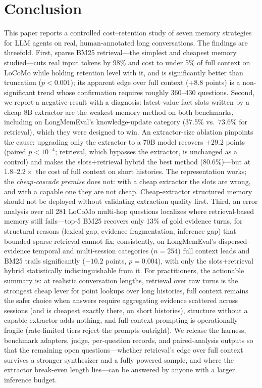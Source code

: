 \documentclass[conference]{IEEEtran}
\begin{document}
\section{Conclusion}

This paper reports a controlled cost--retention study of seven memory strategies for LLM agents on real, human-annotated long conversations. The findings are threefold. First, sparse BM25 retrieval---the simplest and cheapest memory studied---cuts real input tokens by 98\% and cost to under 5\% of full context on LoCoMo while holding retention level with it, and is significantly better than truncation ($p<0.001$); its apparent edge over full context ($+8.8$ points) is a non-significant trend whose confirmation requires roughly 360--430 questions. Second, we report a negative result with a diagnosis: latest-value fact slots written by a cheap 8B extractor are the weakest memory method on both benchmarks, including on LongMemEval's knowledge-update category (37.5\% vs.\ 73.6\% for retrieval), which they were designed to win. An extractor-size ablation pinpoints the cause: upgrading only the extractor to a 70B model recovers $+29.2$ points (paired $p<10^{-4}$; retrieval, which bypasses the extractor, is unchanged as a control) and makes the slots+retrieval hybrid the best method (80.6\%)---but at $1.8$--$2.2\times$ the cost of full context on short histories. The representation works; the \emph{cheap-cascade premise} does not: with a cheap extractor the slots are wrong, and with a capable one they are not cheap. Cheap-extractor structured memory should not be deployed without validating extraction quality first. Third, an error analysis over all 281 LoCoMo multi-hop questions localizes where retrieval-based memory still fails---top-5 BM25 recovers only 13\% of gold evidence turns, for structural reasons (lexical gap, evidence fragmentation, inference gap) that bounded sparse retrieval cannot fix; consistently, on LongMemEval's dispersed-evidence temporal and multi-session categories ($n=254$) full context leads and BM25 trails significantly ($-10.2$ points, $p=0.004$), with only the slots+retrieval hybrid statistically indistinguishable from it. For practitioners, the actionable summary is: at realistic conversation lengths, retrieval over raw turns is the strongest cheap lever for point lookups over long histories, full context remains the safer choice when answers require aggregating evidence scattered across sessions (and is cheapest exactly there, on short histories), structure without a capable extractor adds nothing, and full-context prompting is operationally fragile (rate-limited tiers reject the prompts outright). We release the harness, benchmark adapters, judge, per-question records, and paired-analysis outputs so that the remaining open questions---whether retrieval's edge over full context survives a stronger synthesizer and a fully powered sample, and where the extractor break-even length lies---can be answered by anyone with a larger inference budget.
\end{document}
